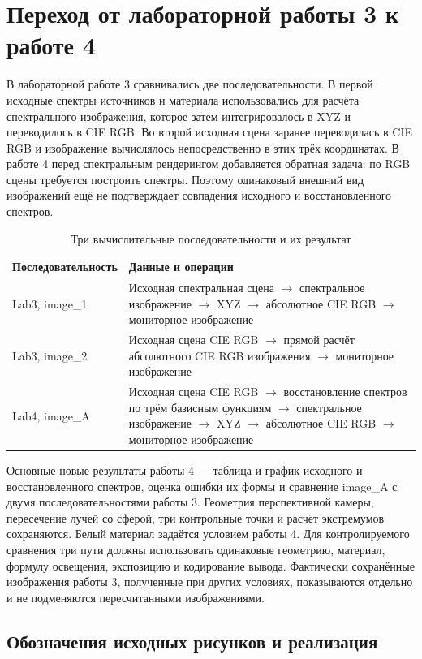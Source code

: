 \section{Переход от лабораторной работы 3 к работе 4}

В лабораторной работе 3 сравнивались две последовательности. В первой исходные спектры источников и материала использовались для расчёта спектрального изображения, которое затем интегрировалось в XYZ и переводилось в CIE RGB. Во второй исходная сцена заранее переводилась в CIE RGB и изображение вычислялось непосредственно в этих трёх координатах. В работе 4 перед спектральным рендерингом добавляется обратная задача: по RGB сцены требуется построить спектры. Поэтому одинаковый внешний вид изображений ещё не подтверждает совпадения исходного и восстановленного спектров.

\begin{table}[htbp]\centering\small
\caption{Три вычислительные последовательности и их результат}
\begin{tabularx}{\textwidth}{@{}lX@{}}\toprule
Последовательность & Данные и операции\\\midrule
Lab3, image\_1 & Исходная спектральная сцена $\to$ спектральное изображение $\to$ XYZ $\to$ абсолютное CIE RGB $\to$ мониторное изображение\\
Lab3, image\_2 & Исходная сцена CIE RGB $\to$ прямой расчёт абсолютного CIE RGB изображения $\to$ мониторное изображение\\
Lab4, image\_A & Исходная сцена CIE RGB $\to$ восстановление спектров по трём базисным функциям $\to$ спектральное изображение $\to$ XYZ $\to$ абсолютное CIE RGB $\to$ мониторное изображение\\\bottomrule
\end{tabularx}\end{table}

Основные новые результаты работы 4 --- таблица и график исходного и восстановленного спектров, оценка ошибки их формы и сравнение image\_A с двумя последовательностями работы 3. Геометрия перспективной камеры, пересечение лучей со сферой, три контрольные точки и расчёт экстремумов сохраняются. Белый материал задаётся условием работы 4. Для контролируемого сравнения три пути должны использовать одинаковые геометрию, материал, формулу освещения, экспозицию и кодирование вывода. Фактически сохранённые изображения работы 3, полученные при других условиях, показываются отдельно и не подменяются пересчитанными изображениями.

\subsection{Обозначения исходных рисунков и реализация}

